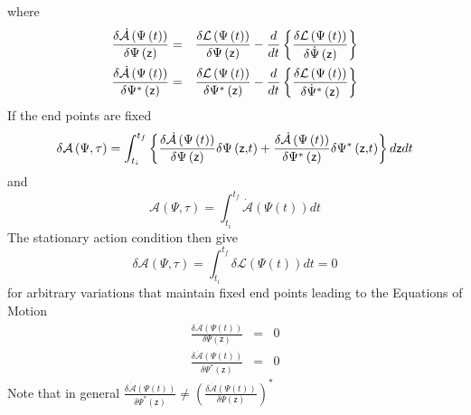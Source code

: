 \documentclass[aps,preprint]{revtex4}
\begin{document}
where 
\begin{eqnarray}
\frac{\delta \mathcal{\dot{A}}\left( \Psi \left( t\right) \right) }{\delta
\Psi \left( \mathsf{z}\right) } &=&\frac{\delta \mathcal{L}\left( \Psi
\left( t\right) \right) }{\delta \Psi \left( \mathsf{z}\right) }-\frac{d}{dt}%
\left\{ \frac{\delta \mathcal{L}\left( \Psi \left( t\right) \right) }{\delta 
\dot{\Psi}\left( \mathsf{z}\right) }\right\}  \notag \\
\frac{\delta \mathcal{\dot{A}}\left( \Psi \left( t\right) \right) }{\delta
\Psi ^{\ast }\left( \mathsf{z}\right) } &=&\frac{\delta \mathcal{L}\left(
\Psi \left( t\right) \right) }{\delta \Psi ^{\ast }\left( \mathsf{z}\right) }%
-\frac{d}{dt}\left\{ \frac{\delta \mathcal{L}\left( \Psi \left( t\right)
\right) }{\delta \dot{\Psi}^{\ast }\left( \mathsf{z}\right) }\right\}
\end{eqnarray}%
If the end points are fixed 
\begin{equation}
\delta \mathcal{A}\left( \Psi ,\tau \right) =\int_{t_{i}}^{t_{f}}\left\{ 
\frac{\delta \mathcal{\dot{A}}\left( \Psi \left( t\right) \right) }{\delta
\Psi \left( \mathsf{z}\right) }\delta \Psi \left( \mathsf{z,}t\right) +\frac{%
\delta \mathcal{\dot{A}}\left( \Psi \left( t\right) \right) }{\delta \Psi
^{\ast }\left( \mathsf{z}\right) }\delta \Psi ^{\ast }\left( \mathsf{z,}%
t\right) \right\} d\mathsf{z}dt
\end{equation}%
and 
\begin{equation}
\mathcal{A}\left( \Psi ,\tau \right) =\int_{t_{i}}^{t_{f}}\mathcal{\dot{A}}%
\left( \Psi \left( t\right) \right) dt
\end{equation}%
The stationary action condition then give 
\begin{equation}
\delta \mathcal{A}\left( \Psi ,\tau \right) =\int_{t_{i}}^{t_{f}}\delta 
\mathcal{L}\left( \Psi \left( t\right) \right) dt=0
\end{equation}%
for arbitrary variations that maintain fixed end points leading to the
Equations of Motion 
\begin{eqnarray}
\frac{\delta \mathcal{\dot{A}}\left( \Psi \left( t\right) \right) }{\delta
\Psi \left( \mathsf{z}\right) } &=&0 \\
\frac{\delta \mathcal{\dot{A}}\left( \Psi \left( t\right) \right) }{\delta
\Psi ^{\ast }\left( \mathsf{z}\right) } &=&0
\end{eqnarray}%
Note that in general $\frac{\delta \mathcal{\dot{A}}\left( \Psi \left(
t\right) \right) }{\delta \Psi ^{\ast }\left( \mathsf{z}\right) }\neq \left( 
\frac{\delta \mathcal{\dot{A}}\left( \Psi \left( t\right) \right) }{\delta
\Psi \left( \mathsf{z}\right) }\right) ^{\ast }$
\end{document}
